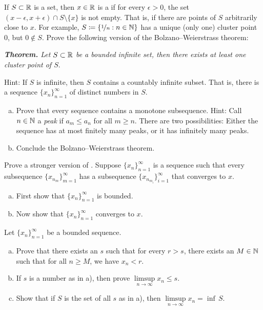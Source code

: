 \begin{exercise}
If $S \subset {\mathbb{R}}$ is a set, then $x \in {\mathbb{R}}$ is a \emph{}
if for every $\epsilon > 0$, the set $(x-\epsilon,x+\epsilon) \cap S
\setminus \{ x \}$ is not empty.  That is, if there are points of $S$
arbitrarily close to $x$.
For example, $S \coloneqq \{ \nicefrac{1}{n} : n \in {\mathbb{N}} \}$ has a unique (only
one) cluster point $0$, but $0 \notin S$.
Prove the following version of the Bolzano--Weierstrass theorem:

\medskip

\noindent
\emph{\textbf{Theorem.} Let $S \subset {\mathbb{R}}$ be a bounded infinite set,
then there exists at least one cluster point of $S$}.

\medskip

Hint: If $S$ is infinite, then $S$ contains a countably infinite subset.
That is, there is a sequence $\{ x_n \}_{n=1}^\infty$ of distinct numbers in $S$.
\end{exercise}

\begin{samepage}
\begin{exercise}[Challenging]
\leavevmode
\begin{enumerate}[a)]
\item
Prove that every sequence contains a monotone subsequence.
Hint: Call $n \in {\mathbb{N}}$ a \emph{peak} if $a_m \leq a_n$ for all $m \geq n$.
There are two possibilities: Either the sequence has at most finitely many
peaks,
or it has infinitely many peaks.
\item
Conclude the Bolzano--Weierstrass theorem.
\end{enumerate}
\end{exercise}
\end{samepage}

\begin{exercise}
Prove a stronger version of .
Suppose $\{ x_n \}_{n=1}^\infty$ is a sequence such that every subsequence
$\{ x_{n_m} \}_{m=1}^\infty$ has a subsequence
$\{ x_{n_{m_i}} \}_{i=1}^\infty$ that converges to $x$.
\begin{enumerate}[a)]
\item
First show that $\{ x_n \}_{n=1}^\infty$ is
bounded.
\item
Now show that $\{ x_n \}_{n=1}^\infty$ converges to $x$.
\end{enumerate}
\end{exercise}

\begin{exercise}
Let $\{x_n\}_{n=1}^\infty$ be a bounded sequence.
\begin{enumerate}[a)]
\item
Prove that there exists an $s$ such that for every $r > s$, there exists 
an $M \in {\mathbb{N}}$ such that for all $n \geq M$, we have
$x_n < r$.
\item
If $s$ is a number as in a), then prove $\limsup\limits_{n\to\infty} x_n \leq s$.
\item
Show that if $S$ is the set of all $s$ as in a), then
$\limsup\limits_{n\to\infty} x_n = \inf \, S$.
\end{enumerate}
\end{exercise}

